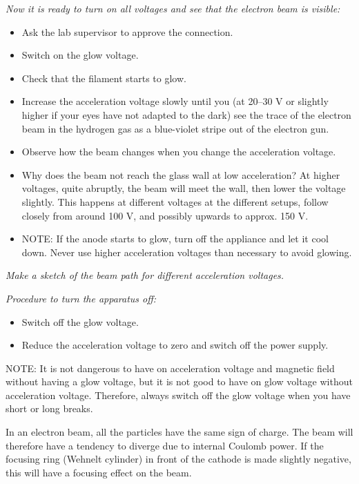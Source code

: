 \documentclass[../Elmag-labhefte-2020.tex]{subfiles}
\begin{document}
\emph{Now it is ready to turn on all voltages and see that the electron beam is visible:}
\begin{itemize}
\item Ask the lab supervisor to approve the connection.
\item Switch on the glow voltage.
\item Check that the filament starts to glow.
\item Increase the acceleration voltage slowly until you (at 20--30 V or slightly higher if your eyes have not adapted to the dark) see the trace of the electron beam in the hydrogen gas as a blue-violet stripe out of the electron gun.
\item Observe how the beam changes when you change the acceleration voltage.
\item Why does the beam not reach the glass wall at low acceleration? At higher voltages, quite abruptly, the beam will meet the wall, then lower the voltage slightly. This happens at different voltages at the different setups, follow closely from around 100 V, and possibly upwards to approx. 150 V.
\item NOTE: If the anode starts to glow, turn off the appliance and let it cool down. Never use higher acceleration voltages than necessary to avoid glowing.
\end{itemize}

\emph{Make a sketch of the beam path for different acceleration voltages.}
%


\emph{Procedure to turn the apparatus off:} 
\begin{itemize}
\item Switch off the glow voltage.
\item Reduce the acceleration voltage to zero and switch off the power supply.
\end{itemize}
NOTE: It is not dangerous to have on acceleration voltage and magnetic field without having  a glow voltage, but it is not good to have on glow voltage without acceleration voltage. Therefore, always switch off the glow voltage when you have short or long breaks.

In an electron beam, all the particles have the same sign of charge. The beam will therefore have a tendency to diverge due to internal Coulomb power. If the focusing ring (Wehnelt cylinder) in front of the cathode is made slightly negative, this will have a focusing effect on the beam.
\end{document}
